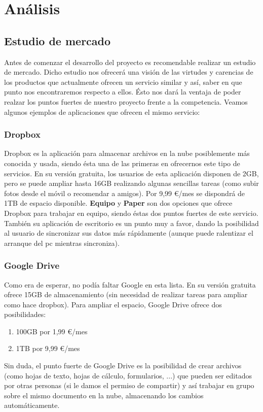\chapter{Análisis}

\section{Estudio de mercado}
Antes de comenzar el desarrollo del proyecto es recomendable realizar un estudio de mercado. Dicho estudio nos ofrecerá una visión de las virtudes y carencias de los productos que actualmente ofrecen un servicio similar y así, saber en que punto nos encontraremos respecto a ellos. Ésto nos dará la ventaja de poder realzar los puntos fuertes de nuestro proyecto frente a la competencia. Veamos algunos ejemplos de aplicaciones que ofrecen el mismo servicio: \\

\subsection{Dropbox \cite{cita_dropbox}}
Dropbox es la aplicación para almacenar archivos en la nube posiblemente más conocida y usada, siendo ésta una de las primeras en ofrecernos este tipo de servicios. En su versión gratuita, los usuarios de esta aplicación disponen de 2GB, pero se puede ampliar hasta 16GB realizando algunas sencillas tareas (como subir fotos desde el móvil o recomendar a amigos). Por 9,99 \euro/mes se dispondrá de 1TB de espacio disponible. \textbf{Equipo} y \textbf{Paper} son dos opciones que ofrece Dropbox para trabajar en equipo, siendo éstas dos puntos fuertes de este servicio. También su aplicación de escritorio es un punto muy a favor, dando la posibilidad al usuario de sincronizar sus datos más rápidamente (aunque puede ralentizar el arranque del pc mientras sincroniza). \\

\subsection{Google Drive \cite{cita_google_drive}}
Como era de esperar, no podía faltar Google en esta lista. En su versión gratuita ofrece 15GB de almacenamiento (sin necesidad de realizar tareas para ampliar como hace dropbox). Para ampliar el espacio, Google Drive ofrece dos posibilidades:
\begin{enumerate}
	\item 100GB por 1,99 \euro/mes
	\item 1TB por 9,99 \euro/mes
\end{enumerate}
Sin duda, el punto fuerte de Google Drive es la posibilidad de crear archivos (como hojas de texto, hojas de cálculo, formularios, ...) que pueden ser editados por otras personas (si le damos el permiso de compartir) y así trabajar en grupo sobre el mismo documento en la nube, almacenando los cambios automáticamente. \\


